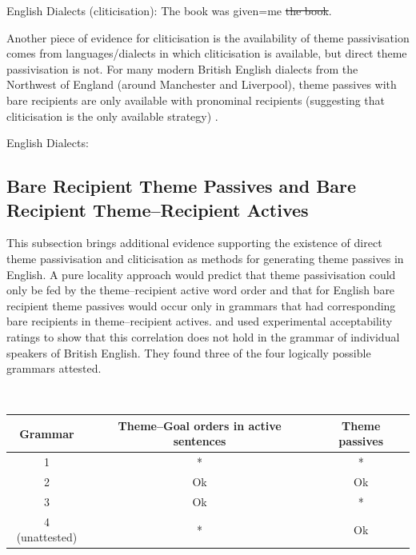\begin{exe}
	\ex English Dialects (cliticisation): The book was given=me \sout{the book}.\label{ex:en-clitic}
\end{exe}

Another piece of evidence for cliticisation is the availability of theme passivisation comes from languages/dialects in which cliticisation is available, but direct theme passivisation is not. For many modern British English dialects from the Northwest of England (around Manchester and Liverpool), theme passives with bare recipients are only available with pronominal recipients (suggesting that cliticisation is the only available strategy) \citep{Haddican.2010,Myler.2011,Haddican.2012,Biggs.2015}.

\begin{exe}
	\ex English Dialects:\label{ex:endial-prosens}
	\begin{xlist}
	\end{xlist}
\end{exe}

\subsection{Bare Recipient Theme Passives and Bare Recipient Theme--Recipient Actives}
This subsection brings additional evidence supporting the existence of direct theme passivisation and cliticisation as methods for generating theme passives in English. A pure locality approach would predict that theme passivisation could only be fed by the theme--recipient active word order and that for English bare recipient theme passives would occur only in grammars that had corresponding bare recipients in theme--recipient actives. \cite{Haddican.2010} and \cite{Haddican.2011,Haddican.2012} used experimental acceptability ratings to show that this correlation does not hold in the grammar of individual speakers of British English. They found three of the four logically possible grammars attested. 

\begin{exe}
\ex \cite[Table 2]{Haddican.2012}\\
 \begin{tabular}{|c|c|c|}
 \hline
 Grammar & Theme--Goal orders in active sentences & Theme passives\\
 \hline
 1 & * & * \\
 \hline
 2 & Ok & Ok \\
 \hline
 3 & Ok & * \\
 \hline
 4 (unattested) & * & Ok \\
 \hline
 \end{tabular}
\end{exe}%

